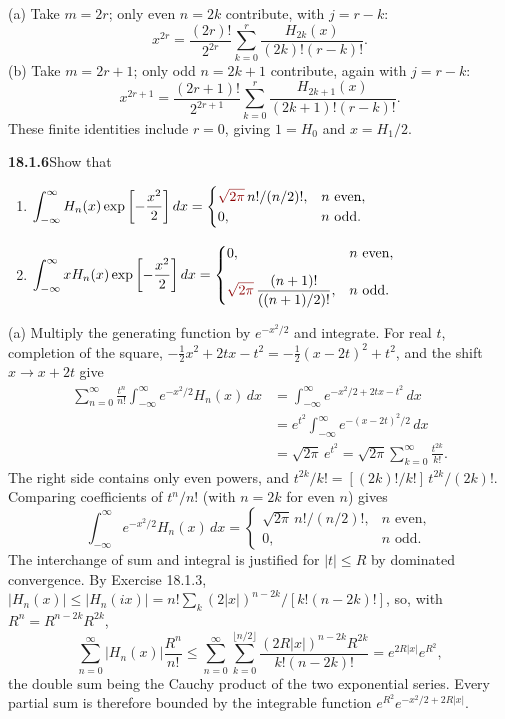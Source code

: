 (a) Take $m=2r$; only even $n=2k$ contribute, with $j=r-k$:
\[
\boxed{x^{2r}=\frac{(2r)!}{2^{2r}}
 \sum_{k=0}^r\frac{H_{2k}(x)}{(2k)!(r-k)!}}.
\]
(b) Take $m=2r+1$; only odd $n=2k+1$ contribute, again with $j=r-k$:
\[
\boxed{x^{2r+1}=\frac{(2r+1)!}{2^{2r+1}}
 \sum_{k=0}^r\frac{H_{2k+1}(x)}{(2k+1)!(r-k)!}}.
\]
These finite identities include $r=0$, giving $1=H_0$ and $x=H_1/2$.

\par\bigskip
\noindent\textbf{18.1.6}\quad Show that
\begin{enumerate}
\item[(a)] $\displaystyle\int_{-\infty}^{\infty}
H_{n}(x)\exp\left[-\frac{x^{2}}{2}\right]dx
=\begin{cases}
\erratum{\sqrt{2\pi}}\,n!/(n/2)!, & n\text{ even},\\
0, & n\text{ odd}.
\end{cases}$
\item[(b)] $\displaystyle\int_{-\infty}^{\infty}
xH_{n}(x)\exp\left[-\frac{x^{2}}{2}\right]dx
=\begin{cases}
0, & n\text{ even},\\[8pt]
\erratum{\sqrt{2\pi}}\,\dfrac{(n+1)!}{((n+1)/2)!}, & n\text{ odd}.
\end{cases}$
\end{enumerate}
\solution
(a) Multiply the generating function by $e^{-x^2/2}$ and integrate.
For real $t$, completion of the square,
$-\tfrac12x^2+2tx-t^2=-\tfrac12(x-2t)^2+t^2$, and the shift
$x\to x+2t$ give
\begin{align*}
\sum_{n=0}^\infty\frac{t^n}{n!}
 \int_{-\infty}^{\infty}e^{-x^2/2}H_n(x)\,dx
 &=\int_{-\infty}^{\infty}e^{-x^2/2+2tx-t^2}\,dx\\
 &=e^{t^2}\int_{-\infty}^{\infty}e^{-(x-2t)^2/2}\,dx\\
 &=\sqrt{2\pi}\,e^{t^2}
 =\sqrt{2\pi}\sum_{k=0}^\infty\frac{t^{2k}}{k!}.
\end{align*}
The right side contains only even powers, and
$t^{2k}/k!=[(2k)!/k!]\,t^{2k}/(2k)!$.  Comparing coefficients of
$t^n/n!$ (with $n=2k$ for even $n$) gives
\[
\boxed{\int_{-\infty}^{\infty}e^{-x^2/2}H_n(x)\,dx
 =\begin{cases}\sqrt{2\pi}\,n!/(n/2)!,&n\text{ even},\\
 0,&n\text{ odd}.\end{cases}}
\]
The interchange of sum and integral is justified for $|t|\le R$ by
dominated convergence.  By Exercise 18.1.3, $|H_n(x)|\le|H_n(ix)|
=n!\sum_k(2|x|)^{n-2k}/[k!(n-2k)!]$, so, with $R^n=R^{n-2k}R^{2k}$,
\[
\sum_{n=0}^\infty|H_n(x)|\frac{R^n}{n!}
 \le\sum_{n=0}^\infty\sum_{k=0}^{\lfloor n/2\rfloor}
 \frac{(2R|x|)^{n-2k}R^{2k}}{k!(n-2k)!}
 =e^{2R|x|}e^{R^2},
\]
the double sum being the Cauchy product of the two exponential series.
Every partial sum is therefore bounded by the integrable function
$e^{R^2}e^{-x^2/2+2R|x|}$.

